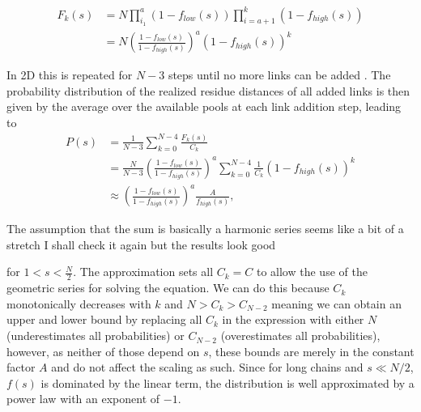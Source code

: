 \documentclass[
reprint,
twocolumn,
amsmath,amssymb,superscriptaddress,aps,
pre]{revtex4-1}
\newcommand{\red}[1]{\textcolor{red!80!black}{#1}}
\begin{document}
\begin{align}
    F_k(s)&=N\prod_{i_1}^a\left(1-f_{low}(s)\right)\prod_{i=a+1}^k\left(1-f_{high}(s)\right) \nonumber \\
    &= N\left(\frac{1-f_{low}(s)}{1-f_{high}(s)}\right)^a\left(1-f_{high}(s)\right)^{k}
\end{align}

In 2D this is repeated for $N-3$ steps until no more links can be added \cite{molkenthin2016scaling}.
The probability distribution of the realized residue distances of all added links is then given by the average over the available pools at each link addition step, leading to
\begin{align}
    P(s)&=\frac{1}{N-3}\sum_{k=0}^{N-4} \frac{F_k(s)}{C_k} \nonumber \\
    &= \frac{N}{N-3}\left(\frac{1-f_{low}(s)}{1-f_{high}(s)}\right)^a
\sum_{k=0}^{N-4} \frac{1}{C_k} \left(1-f_{high}(s)\right)^{k} \nonumber \\
    &\approx \left(\frac{1-f_{low}(s)}{1-f_{high}(s)}\right)^a\frac{A}{f_{high}(s)},
    \label{eq.Ps}
\end{align}

\red{The assumption that the sum is basically a harmonic series seems like a bit of a stretch I shall check it again but the results look good}

for $1<s<\frac{N}{2}$. The approximation sets all $C_k=C$ to allow the use of the geometric series for solving the equation. We can do this because $C_k$ monotonically decreases with $k$ and $N>C_k>C_{N-2}$ meaning we can obtain an upper and lower bound by replacing all $C_k$ in the expression with either $N$ (underestimates all probabilities) or $C_{N-2}$ (overestimates all probabilities), however, as neither of those depend on $s$, these bounds are merely in the constant factor $A$ and do not affect the scaling as such.
Since for long chains and $s \ll N/2$, $f(s)$ is dominated by the linear term, the distribution is well approximated by a power law with an exponent of $-1$.
\end{document}
